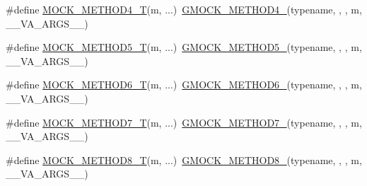 \begin{DoxyCompactItemize}
\item 
\#define \mbox{\hyperlink{_obj__test_2lib_2googletest-master_2googlemock_2include_2gmock_2gmock-generated-function-mockers_8h_a17dde4ac8109f0bf1b73e3509e42c879}{M\+O\+C\+K\+\_\+\+M\+E\+T\+H\+O\+D4\+\_\+T}}(m, ...)~\mbox{\hyperlink{_obj__test_2lib_2googletest-release-1_88_81_2googlemock_2include_2gmock_2gmock-generated-function-mockers_8h_ab6430f2cfad9de4aca5258ea559294bb}{G\+M\+O\+C\+K\+\_\+\+M\+E\+T\+H\+O\+D4\+\_\+}}(typename, , , m, \+\_\+\+\_\+\+V\+A\+\_\+\+A\+R\+G\+S\+\_\+\+\_\+)
\item 
\#define \mbox{\hyperlink{_obj__test_2lib_2googletest-master_2googlemock_2include_2gmock_2gmock-generated-function-mockers_8h_a3566f9bd057c5cee1841f55cbf685947}{M\+O\+C\+K\+\_\+\+M\+E\+T\+H\+O\+D5\+\_\+T}}(m, ...)~\mbox{\hyperlink{_obj__test_2lib_2googletest-release-1_88_81_2googlemock_2include_2gmock_2gmock-generated-function-mockers_8h_a9e3ecd392499ab19a4a6d3adcabf56f6}{G\+M\+O\+C\+K\+\_\+\+M\+E\+T\+H\+O\+D5\+\_\+}}(typename, , , m, \+\_\+\+\_\+\+V\+A\+\_\+\+A\+R\+G\+S\+\_\+\+\_\+)
\item 
\#define \mbox{\hyperlink{_obj__test_2lib_2googletest-master_2googlemock_2include_2gmock_2gmock-generated-function-mockers_8h_a0d16357a0043d36b167a1c42ef33f672}{M\+O\+C\+K\+\_\+\+M\+E\+T\+H\+O\+D6\+\_\+T}}(m, ...)~\mbox{\hyperlink{_obj__test_2lib_2googletest-release-1_88_81_2googlemock_2include_2gmock_2gmock-generated-function-mockers_8h_ad0ca7f6973a076d0af4c953f8ed91842}{G\+M\+O\+C\+K\+\_\+\+M\+E\+T\+H\+O\+D6\+\_\+}}(typename, , , m, \+\_\+\+\_\+\+V\+A\+\_\+\+A\+R\+G\+S\+\_\+\+\_\+)
\item 
\#define \mbox{\hyperlink{_obj__test_2lib_2googletest-master_2googlemock_2include_2gmock_2gmock-generated-function-mockers_8h_a31bdd1d1448052f4122ecebf937a8f44}{M\+O\+C\+K\+\_\+\+M\+E\+T\+H\+O\+D7\+\_\+T}}(m, ...)~\mbox{\hyperlink{_obj__test_2lib_2googletest-release-1_88_81_2googlemock_2include_2gmock_2gmock-generated-function-mockers_8h_ab98a8399ba62b53b375c2807f4d39d2f}{G\+M\+O\+C\+K\+\_\+\+M\+E\+T\+H\+O\+D7\+\_\+}}(typename, , , m, \+\_\+\+\_\+\+V\+A\+\_\+\+A\+R\+G\+S\+\_\+\+\_\+)
\item 
\#define \mbox{\hyperlink{_obj__test_2lib_2googletest-master_2googlemock_2include_2gmock_2gmock-generated-function-mockers_8h_aa7e6573bb6a57f2a2d3c2875caeffaa3}{M\+O\+C\+K\+\_\+\+M\+E\+T\+H\+O\+D8\+\_\+T}}(m, ...)~\mbox{\hyperlink{_obj__test_2lib_2googletest-release-1_88_81_2googlemock_2include_2gmock_2gmock-generated-function-mockers_8h_aa84a36427c44505207b7cad5dec7ad67}{G\+M\+O\+C\+K\+\_\+\+M\+E\+T\+H\+O\+D8\+\_\+}}(typename, , , m, \+\_\+\+\_\+\+V\+A\+\_\+\+A\+R\+G\+S\+\_\+\+\_\+)

\end{DoxyCompactItemize}

